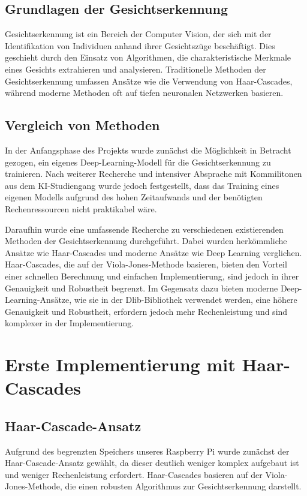 \subsection{Grundlagen der Gesichtserkennung}
Gesichtserkennung ist ein Bereich der Computer Vision, der sich mit der Identifikation von Individuen anhand ihrer Gesichtszüge beschäftigt. Dies geschieht durch den Einsatz von Algorithmen, die charakteristische Merkmale eines Gesichts extrahieren und analysieren. Traditionelle Methoden der Gesichtserkennung umfassen Ansätze wie die Verwendung von Haar-Cascades, während moderne Methoden oft auf tiefen neuronalen Netzwerken basieren.

\subsection{Vergleich von Methoden}
In der Anfangsphase des Projekts wurde zunächst die Möglichkeit in Betracht gezogen, ein eigenes Deep-Learning-Modell für die Gesichtserkennung zu trainieren. Nach weiterer Recherche und intensiver Absprache mit Kommilitonen aus dem KI-Studiengang wurde jedoch festgestellt, dass das Training eines eigenen Modells aufgrund des hohen Zeitaufwands und der benötigten Rechenressourcen nicht praktikabel wäre.

\noindent Daraufhin wurde eine umfassende Recherche zu verschiedenen existierenden Methoden der Gesichtserkennung durchgeführt. Dabei wurden herkömmliche Ansätze wie Haar-Cascades und moderne Ansätze wie Deep Learning verglichen. Haar-Cascades, die auf der Viola-Jones-Methode basieren, bieten den Vorteil einer schnellen Berechnung und einfachen Implementierung, sind jedoch in ihrer Genauigkeit und Robustheit begrenzt. Im Gegensatz dazu bieten moderne Deep-Learning-Ansätze, wie sie in der Dlib-Bibliothek verwendet werden, eine höhere Genauigkeit und Robustheit, erfordern jedoch mehr Rechenleistung und sind komplexer in der Implementierung.



\section{Erste Implementierung mit Haar-Cascades}

\subsection{Haar-Cascade-Ansatz}
Aufgrund des begrenzten Speichers unseres Raspberry Pi wurde zunächst der Haar-Cascade-Ansatz gewählt, da dieser deutlich weniger komplex aufgebaut ist und weniger Rechenleistung erfordert. Haar-Cascades basieren auf der Viola-Jones-Methode, die einen robusten Algorithmus zur Gesichtserkennung darstellt. 

